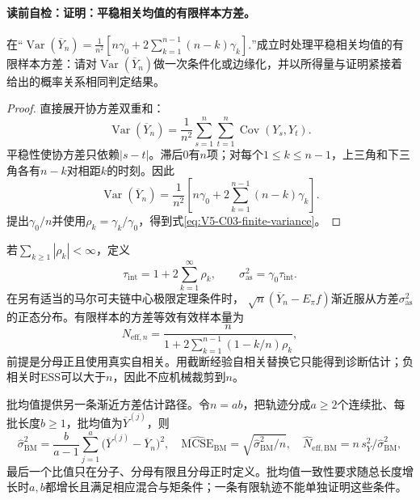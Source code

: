 \paragraph{读前自检：证明：平稳相关均值的有限样本方差。}在“$\operatorname{Var}(\overline Y_n) =\frac1{n^2}\left[n\gamma_0+ 2\sum_{k=1}^{n-1}(n-k)\gamma_k\right].$”成立时处理平稳相关均值的有限样本方差：请对$\operatorname{Var}(\overline Y_n)$做一次条件化或边缘化，并以所得量与证明紧接着给出的概率关系相同判定结果。\par

\begin{proof}
直接展开协方差双重和：
\[
\operatorname{Var}(\overline Y_n)
=\frac1{n^2}\sum_{s=1}^n\sum_{t=1}^n
\operatorname{Cov}(Y_s,Y_t).
\]
平稳性使协方差只依赖$|s-t|$。滞后$0$有$n$项；对每个$1\le k\le n-1$，上三角和下三角各有$n-k$对相距$k$的时刻。因此
\[
\operatorname{Var}(\overline Y_n)
=\frac1{n^2}\left[n\gamma_0+
2\sum_{k=1}^{n-1}(n-k)\gamma_k\right].
\]
提出$\gamma_0/n$并使用$\rho_k=\gamma_k/\gamma_0$，得到式\eqref{eq:V5-C03-finite-variance}。
\end{proof}

若$\sum_{k\ge1}|\rho_k|<\infty$，定义
\begin{equation}\label{eq:V5-C03-iact}
\tau_{\mathrm{int}}
=1+2\sum_{k=1}^{\infty}\rho_k,
\qquad
\sigma_{\mathrm{as}}^2=\gamma_0\tau_{\mathrm{int}}.
\end{equation}
在另有适当的马尔可夫链中心极限定理条件时，
$\sqrt n(\overline Y_n-E_\pi f)$渐近服从方差$\sigma_{\mathrm{as}}^2$的正态分布。有限样本的方差等效有效样本量为
\begin{equation}\label{eq:V5-C03-finite-ess}
N_{\mathrm{eff},n}
=\frac{n}{
1+2\sum_{k=1}^{n-1}(1-k/n)\rho_k},
\end{equation}
前提是分母正且使用真实自相关。用截断经验自相关替换它只能得到诊断估计；负相关时ESS可以大于$n$，因此不应机械裁剪到$n$。

批均值提供另一条渐近方差估计路径。令$n=ab$，把轨迹分成$a\ge2$个连续批、每批长度$b\ge1$，批均值为$\overline Y^{(j)}$，则
\begin{equation}\label{eq:V5-C03-batch-means}
\widehat\sigma_{\mathrm{BM}}^2
=\frac{b}{a-1}\sum_{j=1}^{a}
\bigl(\overline Y^{(j)}-\overline Y_n\bigr)^2,
\quad
\widehat{\mathrm{MCSE}}_{\mathrm{BM}}
=\sqrt{\widehat\sigma_{\mathrm{BM}}^2/n},
\quad
\widehat N_{\mathrm{eff,BM}}
=n\,s_Y^2/\widehat\sigma_{\mathrm{BM}}^2,
\end{equation}
最后一个比值只在分子、分母有限且分母正时定义。批均值一致性要求随总长度增长时$a,b$都增长且满足相应混合与矩条件；一条有限轨迹不能单独证明这些条件。

